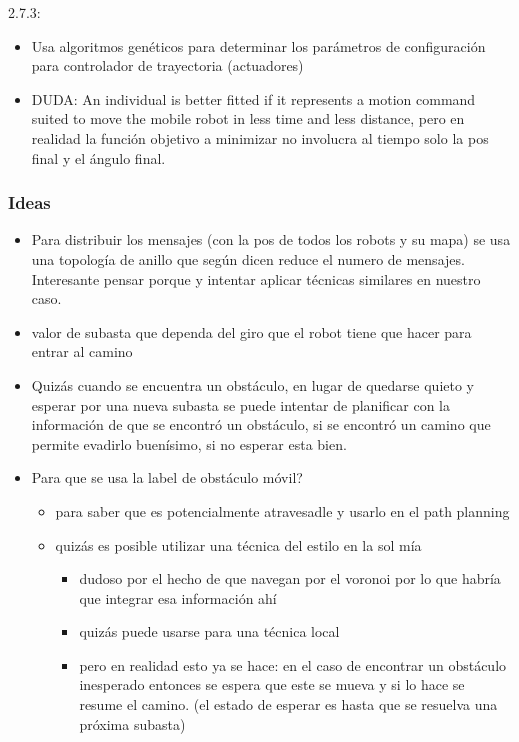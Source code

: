 2.7.3:
\begin{itemize}
\item Usa algoritmos genéticos para determinar los parámetros de configuración para controlador de trayectoria (actuadores)
\item DUDA: An individual is better fitted if it represents a motion command suited to move the mobile robot in less time and less distance, pero en realidad la función objetivo a minimizar no involucra al tiempo solo la pos final y el ángulo final.
\end{itemize}


\subsubsection{Ideas}
\begin{itemize}
\item Para distribuir los mensajes (con la pos de todos los robots y su mapa) se usa una topología de anillo que según dicen reduce el numero de mensajes. Interesante pensar porque y intentar aplicar técnicas similares en nuestro caso.

\item valor de subasta que dependa del giro que el robot tiene que hacer para entrar al camino

\item Quizás cuando se encuentra un obstáculo, en lugar de quedarse quieto y esperar por una nueva subasta se puede intentar de planificar con la información de que se encontró un obstáculo, si se encontró un camino que permite evadirlo buenísimo, si no esperar esta bien.

\item Para que se usa la label de obstáculo móvil?
\begin{itemize}
  \item para saber que es potencialmente atravesadle y usarlo en el path planning
  \item quizás es posible utilizar una técnica del estilo en la sol mía
  \begin{itemize}
    \item dudoso por el hecho de que navegan por el voronoi por lo que habría que integrar esa información ahí
    \item quizás puede usarse para una técnica local 
    \item pero en realidad esto ya se hace: en el caso de encontrar un obstáculo inesperado entonces se espera que este se mueva y si lo hace se resume el camino. (el estado de esperar es hasta que se resuelva una próxima subasta)
  \end{itemize}
\end{itemize}


\end{itemize}
